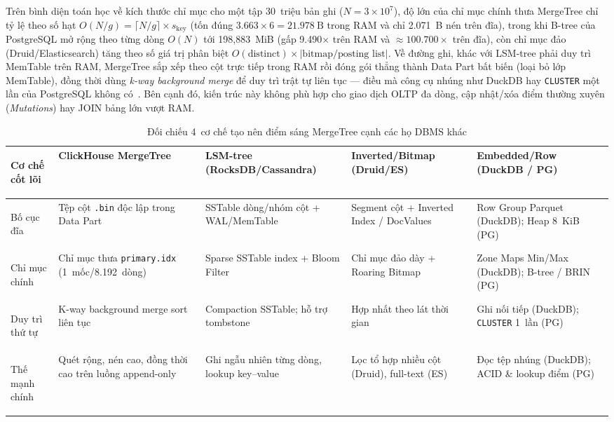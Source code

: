 \documentclass[13pt,a4paper]{report}
\begin{document}
Trên bình diện toán học về kích thước chỉ mục cho một tập 30~triệu bản ghi ($N = 3 \times 10^7$), độ lớn của chỉ mục chính thưa MergeTree chỉ tỷ lệ theo số hạt $O(N/g) = \lceil N / g \rceil \times s_{\text{key}}$ (tốn đúng $3.663 \times 6 = 21.978~\text{B}$ trong RAM và chỉ 2.071~B nén trên đĩa), trong khi B-tree của PostgreSQL mở rộng theo từng dòng $O(N)$ tới 198,883~MiB (gấp 9.490${\times}$ trên RAM và $\approx 100.700{\times}$ trên đĩa), còn chỉ mục đảo (Druid/Elasticsearch) tăng theo số giá trị phân biệt $O(\text{distinct}) \times |\text{bitmap/posting list}|$. Về đường ghi, khác với LSM-tree phải duy trì MemTable trên RAM, MergeTree sắp xếp theo cột trực tiếp trong RAM rồi đóng gói thẳng thành Data Part bất biến (loại bỏ lớp MemTable), đồng thời dùng \textit{k-way background merge} để duy trì trật tự liên tục --- điều mà công cụ nhúng như DuckDB hay \texttt{CLUSTER} một lần của PostgreSQL không có~\cite{A1, S2, P5}. Bên cạnh đó, kiến trúc này không phù hợp cho giao dịch OLTP đa dòng, cập nhật/xóa điểm thường xuyên (\textit{Mutations}) hay JOIN bảng lớn vượt RAM.

\begin{table}[!htb]
\centering
\scriptsize
\setlength{\tabcolsep}{4pt}
\renewcommand{\arraystretch}{1.08}
\caption[Đối chiếu cơ chế lõi MergeTree với 4 họ DBMS khác]{Đối chiếu 4~cơ chế tạo nên điểm sáng MergeTree cạnh các họ DBMS khác}
\label{tab:highlight_vs_others}
\begin{tabularx}{\textwidth}{>{\bfseries\raggedright\arraybackslash}p{2.45cm} >{\raggedright\arraybackslash}p{2.9cm} >{\raggedright\arraybackslash}p{2.9cm} >{\raggedright\arraybackslash}p{2.9cm} >{\raggedright\arraybackslash}X}
\toprule
\textbf{Cơ chế cốt lõi} & \textbf{ClickHouse MergeTree} & \textbf{LSM-tree (RocksDB/Cassandra)} & \textbf{Inverted/Bitmap (Druid/ES)} & \textbf{Embedded/Row (DuckDB / PG)} \\
\midrule
Bố cục đĩa & Tệp cột \texttt{.bin} độc lập trong Data Part & SSTable dòng/nhóm cột + WAL/MemTable & Segment cột + Inverted Index / DocValues & Row Group Parquet (DuckDB); Heap 8~KiB (PG) \\
\addlinespace[2pt]
Chỉ mục chính & Chỉ mục thưa \texttt{primary.idx} (1~mốc/8.192~dòng) & Sparse SSTable index + Bloom Filter & Chỉ mục đảo dày + Roaring Bitmap & Zone Maps Min/Max (DuckDB); B-tree / BRIN (PG) \\
\addlinespace[2pt]
Duy trì thứ tự & K-way background merge sort liên tục & Compaction SSTable; hỗ trợ tombstone & Hợp nhất theo lát thời gian & Ghi nối tiếp (DuckDB); \texttt{CLUSTER} 1~lần (PG) \\
\addlinespace[2pt]
Thế mạnh chính & Quét rộng, nén cao, đồng thời cao trên luồng append-only & Ghi ngẫu nhiên từng dòng, lookup key--value & Lọc tổ hợp nhiều cột (Druid), full-text (ES) & Đọc tệp nhúng (DuckDB); ACID \& lookup điểm (PG) \\
\bottomrule
\end{tabularx}
\end{table}
\end{document}
